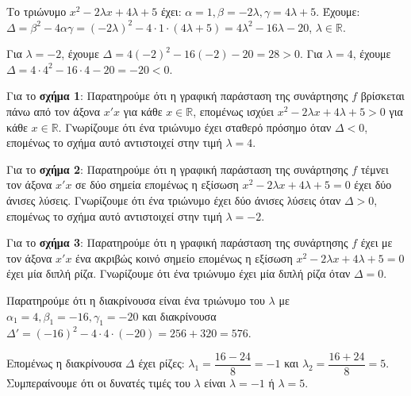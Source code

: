
\begin{alist}
\item Το τριώνυμο $x^2 - 2\lambda x + 4\lambda + 5$ έχει: $\alpha = 1, \beta = -2\lambda, \gamma = 4\lambda + 5$.
Έχουμε: $\Delta = \beta^2 - 4\alpha\gamma = (-2\lambda)^2 - 4 \cdot 1 \cdot (4\lambda + 5) = 4\lambda^2 - 16\lambda - 20$, $\lambda \in \mathbb{R}$.

\item
\begin{rlist}
\item Για $\lambda = -2$, έχουμε $\Delta = 4(-2)^2 - 16(-2) - 20 = 28 > 0$.
Για $\lambda = 4$, έχουμε $\Delta = 4 \cdot 4^2 - 16 \cdot 4 - 20 = -20 < 0$.

Για το \textbf{σχήμα 1}: Παρατηρούμε ότι η γραφική παράσταση της συνάρτησης $f$ βρίσκεται πάνω από τον άξονα $x'x$ για κάθε $x \in \mathbb{R}$, επομένως ισχύει $x^2 - 2\lambda x + 4\lambda + 5 > 0$ για κάθε $x \in \mathbb{R}$. Γνωρίζουμε ότι ένα τριώνυμο έχει σταθερό πρόσημο όταν $\Delta < 0$, επομένως το σχήμα αυτό αντιστοιχεί στην τιμή $\lambda = 4$.

Για το \textbf{σχήμα 2}: Παρατηρούμε ότι η γραφική παράσταση της συνάρτησης $f$ τέμνει τον άξονα $x'x$ σε δύο σημεία επομένως η εξίσωση $x^2 - 2\lambda x + 4\lambda + 5 = 0$ έχει δύο άνισες λύσεις. Γνωρίζουμε ότι ένα τριώνυμο έχει δύο άνισες λύσεις όταν $\Delta > 0$, επομένως το σχήμα αυτό αντιστοιχεί στην τιμή $\lambda = -2$.

\item Για το \textbf{σχήμα 3}: Παρατηρούμε ότι η γραφική παράσταση της συνάρτησης $f$ έχει με τον άξονα $x'x$ ένα ακριβώς κοινό σημείο επομένως η εξίσωση $x^2 - 2\lambda x + 4\lambda + 5 = 0$ έχει μία διπλή ρίζα. Γνωρίζουμε ότι ένα τριώνυμο έχει μία διπλή ρίζα όταν $\Delta = 0$.

Παρατηρούμε ότι η διακρίνουσα είναι ένα τριώνυμο του $\lambda$ με $\alpha_1 = 4, \beta_1 = -16, \gamma_1 = -20$ και διακρίνουσα $\Delta' = (-16)^2 - 4 \cdot 4 \cdot (-20) = 256 + 320 = 576$.

Επομένως η διακρίνουσα $\Delta$ έχει ρίζες: $\lambda_1 = \dfrac{16 - 24}{8} = -1$ και $\lambda_2 = \dfrac{16 + 24}{8} = 5$.
Συμπεραίνουμε ότι οι δυνατές τιμές του $\lambda$ είναι $\lambda = -1$ ή $\lambda = 5$.
\end{rlist}
\end{alist}

